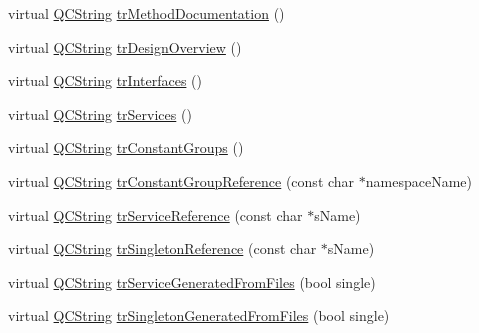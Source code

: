 \begin{DoxyCompactItemize}
\item 
virtual \hyperlink{class_q_c_string}{Q\-C\-String} \hyperlink{class_translator_chinesetraditional_a4666cdb4ca29df1818744d88fc17e619}{tr\-Method\-Documentation} ()
\item 
virtual \hyperlink{class_q_c_string}{Q\-C\-String} \hyperlink{class_translator_chinesetraditional_a5aeee72580ed889d0f0253be39800cc8}{tr\-Design\-Overview} ()
\item 
virtual \hyperlink{class_q_c_string}{Q\-C\-String} \hyperlink{class_translator_chinesetraditional_a3e32b2fdb1d61783cd0fa4734beed3da}{tr\-Interfaces} ()
\item 
virtual \hyperlink{class_q_c_string}{Q\-C\-String} \hyperlink{class_translator_chinesetraditional_a0a0aa68d1d3b75a4b3dd395c7b624f64}{tr\-Services} ()
\item 
virtual \hyperlink{class_q_c_string}{Q\-C\-String} \hyperlink{class_translator_chinesetraditional_a92c2fd6605d059463589fcef7b1cea79}{tr\-Constant\-Groups} ()
\item 
virtual \hyperlink{class_q_c_string}{Q\-C\-String} \hyperlink{class_translator_chinesetraditional_afee1f6e0599fe1d0938c65e7adce44ba}{tr\-Constant\-Group\-Reference} (const char $\ast$namespace\-Name)
\item 
virtual \hyperlink{class_q_c_string}{Q\-C\-String} \hyperlink{class_translator_chinesetraditional_ade4a083ba7d9b0c1317c6c36f5bce96c}{tr\-Service\-Reference} (const char $\ast$s\-Name)
\item 
virtual \hyperlink{class_q_c_string}{Q\-C\-String} \hyperlink{class_translator_chinesetraditional_a548555333d671f53e736a598b1d797a0}{tr\-Singleton\-Reference} (const char $\ast$s\-Name)
\item 
virtual \hyperlink{class_q_c_string}{Q\-C\-String} \hyperlink{class_translator_chinesetraditional_ab5801f97b602eaa907d969d8cc05be08}{tr\-Service\-Generated\-From\-Files} (bool single)
\item 
virtual \hyperlink{class_q_c_string}{Q\-C\-String} \hyperlink{class_translator_chinesetraditional_aefe3e3adb305c5ae4ea863f4586ab0f0}{tr\-Singleton\-Generated\-From\-Files} (bool single)
\end{DoxyCompactItemize}


